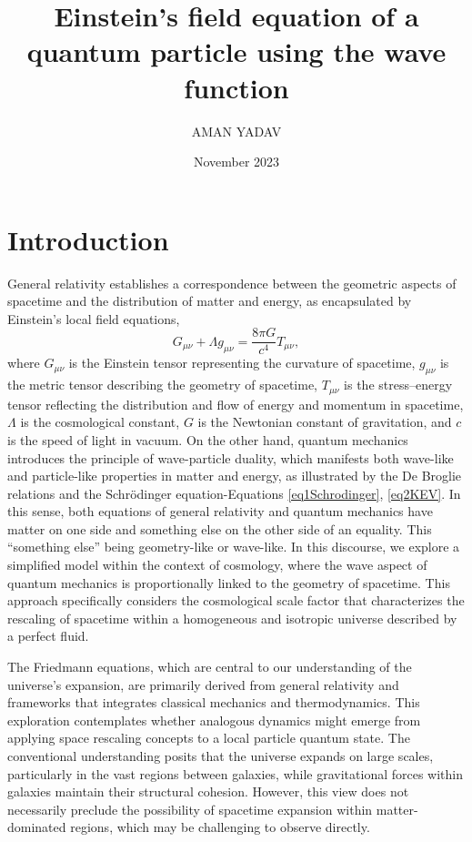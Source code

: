 \documentclass{article}
\title{Einstein’s field equation of a quantum particle using the wave function}
\author{AMAN YADAV}
\date{November 2023}
\begin{document}
\maketitle

\section{Introduction}
General relativity establishes a correspondence between the geometric aspects of spacetime and the distribution of matter and energy, as encapsulated by Einstein's local field equations,
\begin{equation}
G_{\mu\nu} + \Lambda g_{\mu\nu} = \frac{8\pi G}{c^4} T_{\mu\nu},
\end{equation}
where $G_{\mu\nu}$ is the Einstein tensor representing the curvature of spacetime, $g_{\mu\nu}$ is the metric tensor describing the geometry of spacetime, $T_{\mu\nu}$ is the stress–energy tensor reflecting the distribution and flow of energy and momentum in spacetime, $\Lambda$ is the cosmological constant, $G$ is the Newtonian constant of gravitation, and $c$ is the speed of light in vacuum. On the other hand, quantum mechanics introduces the principle of wave-particle duality, which manifests both wave-like and particle-like properties in matter and energy, as illustrated by the De Broglie relations and the Schr{\"o}dinger equation-Equations \ref{eq1Schrodinger}, \ref{eq2KEV}. In this sense, both equations of general relativity and quantum mechanics have matter on one side and something else on the other side of an equality. This ``something else'' being geometry-like or wave-like. In this discourse, we explore a simplified model within the context of cosmology, where the wave aspect of quantum mechanics is proportionally linked to the geometry of spacetime. This approach specifically considers the cosmological scale factor that characterizes the rescaling of spacetime within a homogeneous and isotropic universe described by a perfect fluid.


The Friedmann equations, which are central to our understanding of the universe's expansion, are primarily derived from general relativity and frameworks that integrates classical mechanics and thermodynamics. This exploration contemplates whether analogous dynamics might emerge from applying space rescaling concepts to a local particle quantum state. The conventional understanding posits that the universe expands on large scales, particularly in the vast regions between galaxies, while gravitational forces within galaxies maintain their structural cohesion. However, this view does not necessarily preclude the possibility of spacetime expansion within matter-dominated regions, which may be challenging to observe directly.
\end{document}
